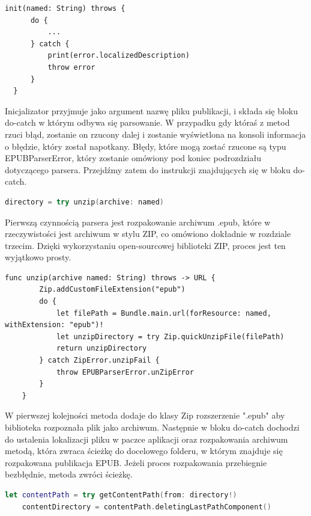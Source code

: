 \begin{lstlisting}[language=swift-reference]
  init(named: String) throws {
      do {
          ...
      } catch {
          print(error.localizedDescription)
          throw error
      }
  }
\end{lstlisting}

Inicjalizator przyjmuje jako argument nazwę pliku publikacji, i składa się bloku do-catch w którym odbywa się parsowanie. W przypadku gdy któraś z metod rzuci błąd, zostanie on rzucony dalej i zostanie wyświetlona na konsoli informacja o błędzie, który został napotkany. Błędy, które mogą zostać rzucone są typu EPUBParserError, który zostanie omówiony pod koniec podrozdziału dotyczącego parsera. Przejdźmy zatem do instrukcji znajdujących się w bloku do-catch.

\begin{lstlisting}[firstnumber=11, language=swift]
    directory = try unzip(archive: named)
\end{lstlisting}

Pierwszą czynnością parsera jest rozpakowanie archiwum .epub, które w rzeczywistości jest archiwum w stylu ZIP, co omówiono dokładnie w rozdziale trzecim. Dzięki wykorzystaniu open-sourcowej biblioteki ZIP, proces jest ten wyjątkowo prosty.

\begin{lstlisting}[caption={Implementacja metody unzip(archive named:).},language=swift-reference]
    func unzip(archive named: String) throws -> URL {
        Zip.addCustomFileExtension("epub")
        do {
            let filePath = Bundle.main.url(forResource: named, withExtension: "epub")!
            let unzipDirectory = try Zip.quickUnzipFile(filePath)
            return unzipDirectory
        } catch ZipError.unzipFail {
            throw EPUBParserError.unZipError
        }
    }
\end{lstlisting}

W pierwszej kolejności metoda dodaje do klasy Zip rozszerzenie ".epub" aby biblioteka rozpoznała plik jako archiwum. Następnie w bloku do-catch dochodzi do ustalenia lokalizacji pliku w paczce aplikacji oraz rozpakowania archiwum metodą, która zwraca ścieżkę do docelowego folderu, w którym znajduje się rozpakowana publikacja EPUB. Jeżeli proces rozpakowania przebiegnie bezbłędnie, metoda zwróci ścieżkę.

\begin{lstlisting}[firstnumber=12, language=swift]
    let contentPath = try getContentPath(from: directory!)
    contentDirectory = contentPath.deletingLastPathComponent()
\end{lstlisting}

